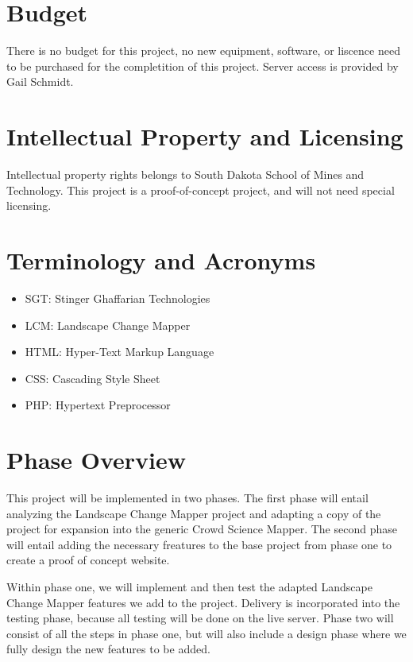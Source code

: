 \section{Budget}
There is no budget for this project, no new equipment, software, or liscence need to be purchased for the completition of this project. Server access is provided by Gail Schmidt.

\section{Intellectual Property and Licensing}
Intellectual property rights belongs to South Dakota School of Mines and Technology. This project is a proof-of-concept project, and will not need special licensing.

\section{Terminology and Acronyms}
\begin{itemize}
\itemsep0em
\item SGT: Stinger Ghaffarian Technologies
\item LCM: Landscape Change Mapper
\item HTML: Hyper-Text Markup Language
\item CSS: Cascading Style Sheet
\item PHP: Hypertext Preprocessor
\end{itemize}

\section{Phase  Overview}
This project will be implemented in two phases. The first phase will entail analyzing the Landscape Change Mapper project and adapting a copy of the project for expansion into the generic Crowd Science Mapper. The  second phase will entail adding the necessary freatures to the base project from phase one to create a proof of concept website.

Within phase one, we will implement and then test the adapted Landscape Change Mapper features we add to the project. Delivery is incorporated into the testing phase, because all testing will be done on the live server. Phase two will consist of all the steps in phase one, but will also include a design phase where we fully design the new features to be added.

